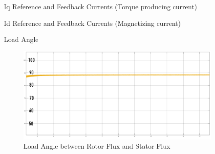 \begin{frame}{Iq Reference and Feedback Currents (Torque producing current)}
	\begin{figure}
		\centering


	\end{figure}
\end{frame}

\begin{frame}{Id Reference and Feedback Currents (Magnetizing current)}
	\begin{figure}
		\centering


	\end{figure}
\end{frame}


\begin{frame}{Load Angle}
\begin{figure}[H]
	\centering
	\includegraphics[width=4in]{sections/section3/images/simulationResutls/LoadAngle.png}
	\caption{Load Angle between Rotor Flux and Stator Flux}
	\label{fig:load_angle_1}
\end{figure}
\end{frame}

